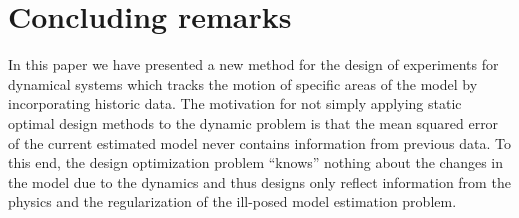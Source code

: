 \documentclass[11pt]{article}
\newcommand{\bfm}	{{\bf{m}}}
\begin{document}


\section{Concluding remarks}
In this paper we have presented a new method for the design of experiments for dynamical systems which tracks the motion of specific areas of the model by incorporating historic data. 
The motivation for not simply applying static optimal design methods to the dynamic problem is that the mean squared error of the current estimated model never contains information from previous data.
To this end, the design optimization problem ``knows'' nothing about the changes in  the model due to the dynamics and thus designs only reflect information from the physics and the regularization of the ill-posed model estimation problem.  
\end{document}
